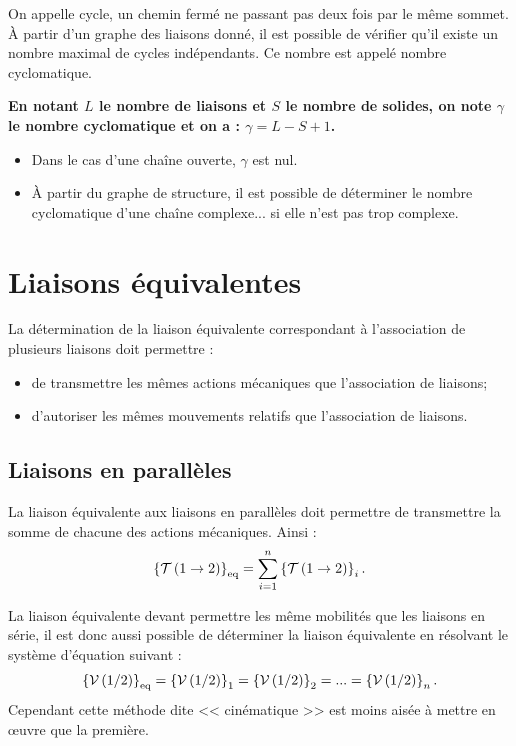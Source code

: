 \documentclass[10pt,fleqn]{article} %
\begin{document}
\begin{defi}
\begin{multicols}{3}
\end{multicols}

On appelle cycle, un chemin fermé ne passant pas deux fois par le même sommet.
À partir d’un graphe des liaisons donné, il est possible de vérifier qu’il existe un nombre
maximal de cycles indépendants. Ce nombre est appelé nombre cyclomatique. 

\textbf{En notant $L$ le nombre de liaisons et $S$ le nombre de solides, on note $\gamma$ le nombre cyclomatique et on a : $\gamma = L - S + 1$.}
\end{defi}

\begin{rem}
\begin{itemize}
\item Dans le cas d'une chaîne ouverte, $\gamma$ est nul. 
\item À partir du graphe de structure, il est possible de déterminer le nombre cyclomatique d'une chaîne complexe... si elle n'est pas trop complexe.
\end{itemize}
\end{rem}

\section{Liaisons équivalentes}
\begin{obj}
La détermination de la liaison équivalente correspondant à l'association de plusieurs liaisons doit permettre : 
\begin{itemize}
\item de transmettre les mêmes actions mécaniques que l'association de liaisons;
\item d'autoriser les mêmes mouvements relatifs que l'association de liaisons.
\end{itemize}
\end{obj}

\subsection{Liaisons en parallèles}
\begin{methode}
La liaison équivalente aux liaisons en parallèles doit permettre de transmettre la somme de chacune des actions mécaniques. Ainsi : 
$$
\left\{\mathcal{T} \left(1\rightarrow 2 \right) \right\}_{\text{eq}} = \sum\limits_{i=1}^{n}\left\{\mathcal{T} \left(1\rightarrow 2 \right) \right\}_{i}.
$$ 
\end{methode}

\begin{rem}
La liaison équivalente devant permettre les même mobilités que les liaisons en série, il est donc aussi possible de déterminer la liaison équivalente en résolvant le système d'équation suivant : 
$$
\left\{\mathcal{V} \left(1/2 \right) \right\}_{\text{eq}} 
= \left\{\mathcal{V} \left(1/2 \right) \right\}_1
= \left\{\mathcal{V} \left(1/2 \right) \right\}_2
=...
= \left\{\mathcal{V} \left(1/2 \right) \right\}_n.
$$ 
Cependant cette méthode dite << cinématique >> est moins aisée à mettre en \oe{}uvre que la première.

\end{rem}
\end{document}
